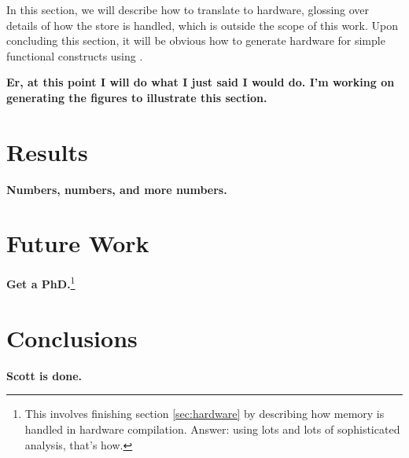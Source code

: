 \documentclass[12pt,notitlepage,twoside]{article}
\begin{document}
In this section, we will describe how to translate \ssiplus{} to
hardware, glossing over details of how the store is handled, which is
outside the scope of this work.  Upon concluding this section, it will
be obvious how to generate hardware for simple functional constructs
using \ssiplus.

\textbf{Er, at this point I will do what I just said I would do.  I'm
working on generating the figures to illustrate this section.}

\section{Results}
\textbf{Numbers, numbers, and more numbers.}

\section{Future Work}
\textbf{Get a PhD.}\footnote{This involves finishing section
\ref{sec:hardware} by describing how memory is handled in hardware
compilation.  Answer: using lots and lots of sophisticated analysis,
that's how.}

\section{Conclusions}
\textbf{Scott is done.}


\appendix
\end{document}
